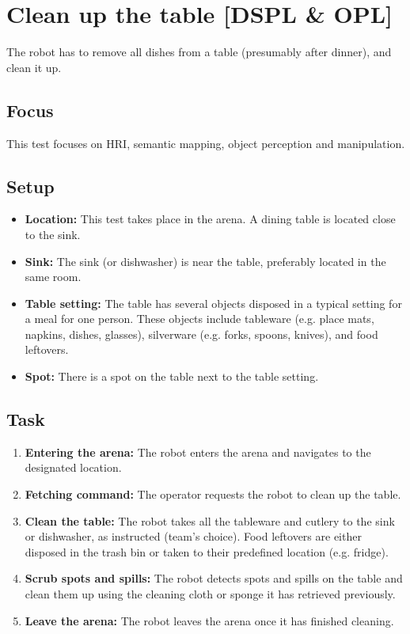 \section{Clean up the table [DSPL \& OPL]}
The robot has to remove all dishes from a table (presumably after dinner), and clean it up.

\subsection{Focus}
This test focuses on HRI, semantic mapping, object perception and manipulation.

\subsection{Setup}
\begin{itemize}
	\item \textbf{Location:} This test takes place in the arena. A dining table is located close to the sink.
	\item \textbf{Sink:} The sink (or dishwasher) is near the table, preferably located in the same room.
	\item \textbf{Table setting:} The table has several objects disposed in a typical setting for a meal for one person. These objects include tableware (e.g. place mats, napkins, dishes, glasses), silverware (e.g. forks, spoons, knives), and food leftovers.
	\item \textbf{Spot:} There is a spot on the table next to the table setting.
\end{itemize}

\subsection{Task}
	\begin{enumerate}
		\item \textbf{Entering the arena:} The robot enters the arena and navigates to the designated location.
		\item \textbf{Fetching command:} The operator requests the robot to clean up the table.
		\item \textbf{Clean the table:} The robot takes all the tableware and cutlery to the sink or dishwasher, as instructed (team's choice). Food leftovers are either disposed in the trash bin or taken to their predefined location (e.g. fridge).
		\item \textbf{Scrub spots and spills:} The robot detects spots and spills on the table and clean them up using the cleaning cloth or sponge it has retrieved previously.
		\item \textbf{Leave the arena:} The robot leaves the arena once it has finished cleaning.
	\end{enumerate}

